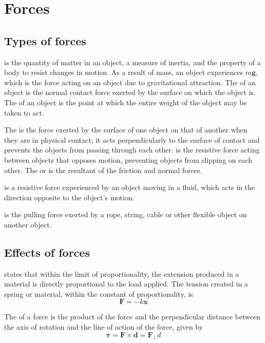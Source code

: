 \documentclass[Physics.tex]{subfiles}
\begin{document}
\chapter{Forces}
\section{Types of forces}
 is the quantity of matter in an object, a measure of inertia, and the property of a body to resist changes in motion. As a result of mass, an object experiences  \(m\mathbf{g}\), which is the force acting on an object due to gravitational attraction. The  of an object is the normal contact force exerted by the surface on which the object is. The  of an object is the point at which the entire weight of the object may be taken to act.

The  is the force exerted by the surface of one object on that of another when they are in physical contact; it acts perpendicularly to the surface of contact and prevents the objects from passing through each other.  is the resistive force acting between objects that opposes motion, preventing objects from slipping on each other. The  or  is the resultant of the friction and normal forces.

 is a resistive force experienced by an object moving in a fluid, which acts in the direction opposite to the object's motion.

 is the pulling force exerted by a rope, string, cable or other flexible object on another object.
\section{Effects of forces}
 states that within the limit of proportionality, the extension produced in a material is directly proportional to the load applied. The tension created in a spring or material, within the constant of proportionality, is \begin{equation}\mathbf{F} = -k\mathbf{x}\end{equation}

The  of a force is the product of the force and the perpendicular distance between the axis of rotation and the line of action of the force, given by \begin{equation}\mathbf{\tau} = \mathbf{F} \times \mathbf{d} = \mathbf{F}_{\mathrel\bot} d\end{equation}
\end{document}
